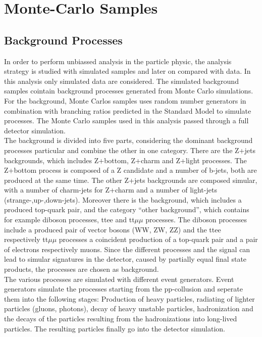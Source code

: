 \chapter{Monte-Carlo Samples}

\section{Background Processes}
\label{samples}
In order to perform unbiassed analysis in the particle physic, the analysis strategy is studied with simulated samples and later on compared with data.
In this analysis only simulated data are considered.
The simulated background samples cointain background processes generated from Monte Carlo simulations.
For the background,  Monte Carlos samples uses random number generators in combination with branching ratios predicted in the Standard Model to simulate processes.
The Monte Carlo samples used in this analysis passed through a full detector simulation.\\
The background is divided into five parts, considering the dominant background processes particular and combine the other in one category.
There are the Z+jets backgrounds, which includes Z+bottom, Z+charm and Z+light processes.
The Z+bottom process is composed of a Z candidate and a number of b-jets, both are produced at the same time.
The other Z+jets backgrounds are composed simular, with a number of charm-jets for Z+charm and a number of light-jets (strange-,up-,down-jets).
Moreover there is the \ttbar{} background, which includes a produced top-quark pair, and the category ``other background'', which contains for example diboson processes, ttee and tt$\mu \mu$ processes.
The diboson processes include a produced pair of vector bosons (WW, ZW, ZZ) and the ttee respectively tt$\mu \mu$ processes a coincident production of a top-quark pair and a pair of electrons respectively muons.
Since the different processes and the signal can lead to simular signatures in the detector, caused by partially equal final state products, the processes are chosen as background. \\
The various processes are simulated with different event generators.
Event generators simulate the processes starting from the pp-collusion and seperate them into the following stages:
Production of heavy particles, radiating of lighter particles (gluons, photons), decay of heavy unstable particles, hadronization and the decays of the particles resulting from the hadronizations into long-lived particles. 
The resulting particles finally go into the detector simulation.
